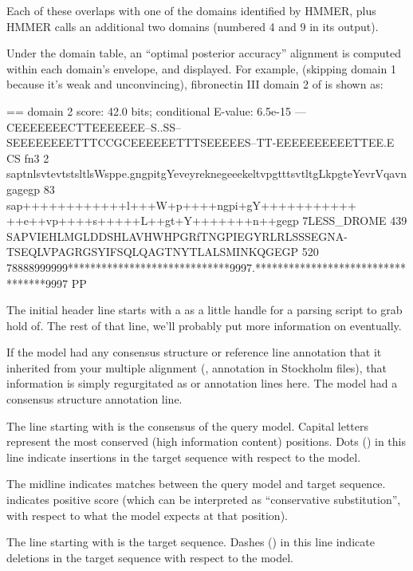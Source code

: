 Each of these overlaps with one of the domains identified by HMMER,
plus HMMER calls an additional two domains (numbered 4 and 9 in its
output).


Under the domain table, an ``optimal posterior accuracy'' alignment
\citep{Holmes98} is computed within each domain's envelope, and
displayed. For example, (skipping domain 1 because it's weak and
unconvincing), fibronectin III domain 2 of  is
shown as:

\begin{sreoutput}
 == domain 2    score: 42.0 bits;  conditional E-value: 6.5e-15
                  ---CEEEEEEECTTEEEEEEE--S..SS--SEEEEEEEETTTCCGCEEEEEETTTSEEEEES--TT-EEEEEEEEEETTEE.E CS
          fn3   2 saptnlsvtevtstsltlsWsppe.gngpitgYeveyreknegeeekeltvpgtttsvtltgLkpgteYevrVqavngagegp 83 
                  sap++++++++++++l+++W+p++++ngpi+gY+++++++++++ ++e++vp++++s+++++L++gt+Y+++++++n++gegp
  7LESS_DROME 439 SAPVIEHLMGLDDSHLAVHWHPGRfTNGPIEGYRLRLSSSEGNA-TSEQLVPAGRGSYIFSQLQAGTNYTLALSMINKQGEGP 520
                  78888999999*****************************9997.**********************************9997 PP
\end{sreoutput}

The initial header line starts with a \prog{==} as a little handle for
a parsing script to grab hold of. The rest of that line, we'll
probably put more information on eventually.

If the model had any consensus structure or reference line annotation
that it inherited from your multiple alignment (,
 annotation in Stockholm files), that information is
simply regurgitated as  or  annotation lines
here. The  model had a consensus structure annotation line.

The line starting with  is the consensus of the query
model. Capital letters represent the most conserved (high information
content) positions. Dots () in this line indicate insertions
in the target sequence with respect to the model.

The midline indicates matches between the query model and target
sequence. \prog{+} indicates positive score (which can be interpreted
as ``conservative substitution'', with respect to what the model
expects at that position). 

The line starting with  is the target sequence.
Dashes (\prog{-}) in this line indicate deletions in the target
sequence with respect to the model.

